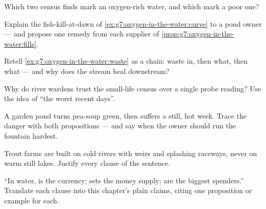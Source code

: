 \begin{exercise}[$\star$]\label{exo:g7:oxygen-in-the-water:6}
Which two census finds mark an oxygen-rich water, and
which mark a poor one?
\end{exercise}

\begin{exercise}[$\star\star$]\label{exo:g7:oxygen-in-the-water:7}
Explain the fish-kill-at-dawn of
\cref{ex:g7:oxygen-in-the-water:curve} to a pond owner ---
and propose one remedy from each supplier of
\cref{prop:g7:oxygen-in-the-water:fills}.
\end{exercise}

\begin{exercise}[$\star\star$]\label{exo:g7:oxygen-in-the-water:8}
Retell \cref{ex:g7:oxygen-in-the-water:waste} as a chain:
waste in, then what, then what --- and why does the stream
heal downstream?
\end{exercise}

\begin{exercise}[$\star\star$]\label{exo:g7:oxygen-in-the-water:9}
Why do river wardens trust the small-life census over a
single probe reading? Use the idea of ``the worst recent
days''.
\end{exercise}

\begin{exercise}[$\star\star$]\label{exo:g7:oxygen-in-the-water:10}
A garden pond turns pea-soup green, then suffers a still,
hot week. Trace the danger with both propositions --- and
say when the owner should run the fountain hardest.
\end{exercise}

\begin{exercise}[$\star\star$]\label{exo:g7:oxygen-in-the-water:11}
Trout farms are built on cold rivers with weirs and
splashing raceways, never on warm still lakes. Justify
every clause of the sentence.
\end{exercise}

\begin{exercise}[$\star\star\star$]\label{exo:g7:oxygen-in-the-water:12}
``In water,  is the currency;  sets the
money supply;  are the biggest spenders.''
Translate each clause into this chapter's plain claims,
citing one proposition or example for each.
\end{exercise}

